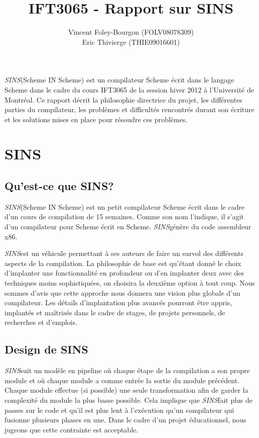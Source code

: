 \documentclass[11pt]{report}
\begin{document}
\newcommand{\sins}{\emph{SINS}}

\title{IFT3065 - Rapport sur SINS}
\author{Vincent Foley-Bourgon (FOLV08078309) \\
Eric Thivierge (THIE09016601)}
\maketitle

\abstract

\sins (Scheme IN Scheme) est un compilateur Scheme écrit dans le
langage Scheme dans le cadre du cours IFT3065 de la session hiver 2012
à l'Université de Montréal.  Ce rapport décrit la philosophie
directrice du projet, les différentes parties du compilateur, les
problèmes et difficultés rencontrés durant son écriture et les
solutions mises en place pour résoudre ces problèmes.

\chapter{SINS}

\section{Qu'est-ce que SINS?}

\sins (Scheme IN Scheme) est un petit compilateur Scheme écrit
dans le cadre d'un cours de compilation de 15 semaines.  Comme son nom
l'indique, il s'agit d'un compilateur pour Scheme écrit en Scheme.
\sins génère du code assembleur x86.

\sins est un véhicule permettant à ses auteurs de faire un
survol des différents aspects de la compilation.  La philosophie de
base est qu'étant donné le choix d'implanter une fonctionnalité en
profondeur ou d'en implanter deux avec des techniques moins
sophistiquées, on choisira la deuxième option à tout coup.  Nous
sommes d'avis que cette approche nous donnera une vision plus globale
d'un compilateur.  Les détails d'implantation plus avancés pourront
être appris, implantés et maîtrisés dans le cadre de stages, de
projets personnels, de recherches et d'emplois.


\section{Design de SINS}

\sins suit un modèle en pipeline où chaque étape de la compilation a
son propre module et où chaque module a comme entrée la sortie du
module précédent.  Chaque module effectue (si possible) une seule
transformation afin de garder la complexité du module la plus basse
possible.  Cela implique que \sins fait plus de passes sur le code et
qu'il est plus lent à l'exécution qu'un compilateur qui fusionne
plusieurs phases en une.  Dans le cadre d'un projet éducationnel,
nous jugeons que cette contrainte est acceptable.
\end{document}
